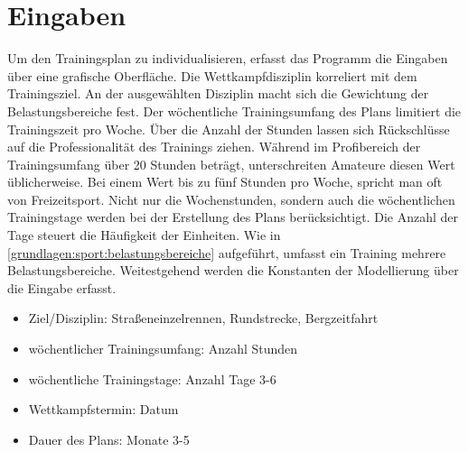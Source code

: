 \section{Eingaben}
Um den Trainingsplan zu individualisieren, erfasst das Programm die Eingaben über eine grafische Oberfläche. Die Wettkampfdisziplin korreliert mit dem Trainingsziel. An der ausgewählten Disziplin macht sich die Gewichtung der Belastungsbereiche fest. Der wöchentliche Trainingsumfang des Plans limitiert die Trainingszeit pro Woche. Über die Anzahl der Stunden lassen sich Rückschlüsse auf die Professionalität des Trainings ziehen. Während im Profibereich der Trainingsumfang über 20 Stunden beträgt, unterschreiten Amateure diesen Wert üblicherweise. Bei einem Wert bis zu fünf Stunden pro Woche, spricht man oft von Freizeitsport. \newline
Nicht nur die Wochenstunden, sondern auch die wöchentlichen Trainingstage werden bei der Erstellung des Plans berücksichtigt. Die Anzahl der Tage steuert die Häufigkeit der Einheiten.
Wie in \ref{grundlagen:sport:belastungsbereiche} aufgeführt, umfasst ein Training mehrere Belastungsbereiche. Weitestgehend werden die Konstanten der Modellierung über die Eingabe erfasst. 
\begin{itemize}
    \item Ziel/Disziplin: Straßeneinzelrennen, Rundstrecke, Bergzeitfahrt
    \item wöchentlicher Trainingsumfang: Anzahl Stunden 
    \item wöchentliche Trainingstage: Anzahl Tage 3-6
    \item Wettkampfstermin: Datum
    \item Dauer des Plans: Monate 3-5
\end{itemize}
    
